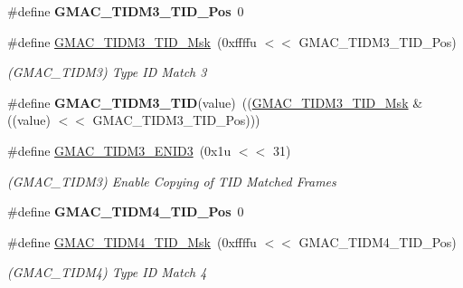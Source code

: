 \begin{DoxyCompactItemize}
\mbox{\label{group__SAMV71__GMAC_ga39ca0cd230d31204823c933ee830a5bb}} 
\#define {\bfseries G\+M\+A\+C\+\_\+\+T\+I\+D\+M3\+\_\+\+T\+I\+D\+\_\+\+Pos}~0
\item 
\mbox{\label{group__SAMV71__GMAC_gab03a9cab55ab449133b8c58951306344}} 
\#define \mbox{\hyperlink{group__SAMV71__GMAC_gab03a9cab55ab449133b8c58951306344}{G\+M\+A\+C\+\_\+\+T\+I\+D\+M3\+\_\+\+T\+I\+D\+\_\+\+Msk}}~(0xffffu $<$$<$ G\+M\+A\+C\+\_\+\+T\+I\+D\+M3\+\_\+\+T\+I\+D\+\_\+\+Pos)
\begin{DoxyCompactList}\small\item\em (G\+M\+A\+C\+\_\+\+T\+I\+D\+M3) Type ID Match 3 \end{DoxyCompactList}\item 
\mbox{\label{group__SAMV71__GMAC_gacf2fc9977445f17d965f30a1667e4ac8}} 
\#define {\bfseries G\+M\+A\+C\+\_\+\+T\+I\+D\+M3\+\_\+\+T\+ID}(value)~((\mbox{\hyperlink{group__SAMV71__GMAC_gab03a9cab55ab449133b8c58951306344}{G\+M\+A\+C\+\_\+\+T\+I\+D\+M3\+\_\+\+T\+I\+D\+\_\+\+Msk}} \& ((value) $<$$<$ G\+M\+A\+C\+\_\+\+T\+I\+D\+M3\+\_\+\+T\+I\+D\+\_\+\+Pos)))
\item 
\mbox{\label{group__SAMV71__GMAC_ga168f56266b2b810449f46f3ea2b97901}} 
\#define \mbox{\hyperlink{group__SAMV71__GMAC_ga168f56266b2b810449f46f3ea2b97901}{G\+M\+A\+C\+\_\+\+T\+I\+D\+M3\+\_\+\+E\+N\+I\+D3}}~(0x1u $<$$<$ 31)
\begin{DoxyCompactList}\small\item\em (G\+M\+A\+C\+\_\+\+T\+I\+D\+M3) Enable Copying of T\+ID Matched Frames \end{DoxyCompactList}\item 
\mbox{\label{group__SAMV71__GMAC_ga0f0b2807b2e2d4f0b28e44e04eb50e62}} 
\#define {\bfseries G\+M\+A\+C\+\_\+\+T\+I\+D\+M4\+\_\+\+T\+I\+D\+\_\+\+Pos}~0
\item 
\mbox{\label{group__SAMV71__GMAC_ga8ff11c8fe9e79c07cb9169549b3fcd62}} 
\#define \mbox{\hyperlink{group__SAMV71__GMAC_ga8ff11c8fe9e79c07cb9169549b3fcd62}{G\+M\+A\+C\+\_\+\+T\+I\+D\+M4\+\_\+\+T\+I\+D\+\_\+\+Msk}}~(0xffffu $<$$<$ G\+M\+A\+C\+\_\+\+T\+I\+D\+M4\+\_\+\+T\+I\+D\+\_\+\+Pos)
\begin{DoxyCompactList}\small\item\em (G\+M\+A\+C\+\_\+\+T\+I\+D\+M4) Type ID Match 4 \end{DoxyCompactList}\item 

\end{DoxyCompactItemize}
